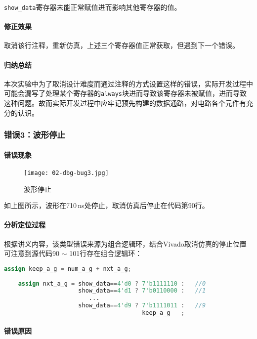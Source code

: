 \documentclass[UTF-8,twoside,c5size]{ctexart}
\begin{document}
	\texttt{show\_data}寄存器未能正常赋值进而影响其他寄存器的值。
	
	\paragraph{修正效果}\hfill
	
	取消该行注释，重新仿真，上述三个寄存器值正常获取，但遇到下一个错误。
	
	\paragraph{归纳总结}\hfill
	
	本次实验中为了取消设计难度而通过注释的方式设置这样的错误，实际开发过程中可能会漏写了处理某个寄存器的\texttt{always}块进而导致该寄存器未被赋值，进而导致这种问题。故而实际开发过程中应牢记预先构建的数据通路，对电路各个元件有充分的认识。
	
	\subsubsection{错误3：波形停止}
	\paragraph{错误现象}\hfill
		
	\begin{figure}[!h]
		\centering
		\texttt{[image: 02-dbg-bug3.jpg]}
		\caption{波形停止}
	\end{figure}

	如上图所示，波形在710\,ns处停止，取消仿真后停止在代码第90行。

	\paragraph{分析定位过程}\hfill
	
	根据讲义内容，该类型错误来源为组合逻辑环，结合Vivado取消仿真的停止位置可注意到源代码90 $ \sim $ 101行存在组合逻辑环：
	\begin{lstlisting}[language=verilog]
	assign keep_a_g = num_a_g + nxt_a_g;
	
	assign nxt_a_g = show_data==4'd0 ? 7'b1111110 :   //0
					 show_data==4'd1 ? 7'b0110000 :   //1
					    ...
					 show_data==4'd9 ? 7'b1111011 :   //9
									   keep_a_g   ;
	\end{lstlisting}

	\paragraph{错误原因}\hfill
	
\end{document}

